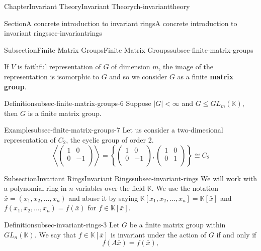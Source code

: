 \documentclass[oneside,10pt,]{book}
\newcommand{\terminology}[1]{\textbf{#1}}
\newcommand{\amp}{&}
\begin{document}
\begin{chapterptx}{Chapter}{Invariant Theory}{}{Invariant Theory}{}{}{ch-invarianttheory}
\begin{sectionptx}{Section}{A concrete introduction to invariant rings}{}{A concrete introduction to invariant rings}{}{}{sec-invariantrings}
\begin{subsectionptx}{Subsection}{Finite Matrix Groups}{}{Finite Matrix Groups}{}{}{subsec-finite-matrix-groups}
\par
If \(V \) is faithful representation of \(G \) of dimension \(m\), the image of the representation is isomorphic to \(G \) and so we consider \(G \) as a finite \terminology{matrix group}.%
\begin{definition}{Definition}{}{subsec-finite-matrix-groups-6}%
Suppose \(|G| < \infty\) and \(G \leq GL_m(\mathbb{K})\),  then \(G\) is a finite matrix group.%
\end{definition}
\begin{example}{Example}{}{subsec-finite-matrix-groups-7}%
Let us consider a two-dimesional representation of \(C_2\), the cyclic group of order 2.%
\begin{equation*}
\left\langle \begin{pmatrix}
1 \amp 0 \\
0 \amp -1 \\
\end{pmatrix} \right\rangle = \left\{ \begin{pmatrix}
1 \amp 0 \\
0 \amp -1 \\
\end{pmatrix},\begin{pmatrix}
1 \amp 0 \\
0 \amp 1 \\
\end{pmatrix} \right \} \cong C_2
\end{equation*}
%
\end{example}
\end{subsectionptx}
%
%
\typeout{************************************************}
\typeout{************************************************}
%
\begin{subsectionptx}{Subsection}{Invariant Rings}{}{Invariant Rings}{}{}{subsec-invariant-rings}
We will work with a polynomial ring in \(n\) variables over the field \(\mathbb{K}\). We use the notation \(\bar x = (x_1, x_2,..., x_n)\) and abuse it by saying \(\mathbb{K}[x_1,x_2,...,x_n]=\mathbb{K}[\bar x]\) and \(f(x_1,x_2,...,x_n)=f(\bar x)\) for \(f \in \mathbb{K}[\bar x]\).%
\begin{definition}{Definition}{}{subsec-invariant-rings-3}%
Let \(G\) be a finite matrix group within \(GL_n(\mathbb{K})\). We say that \(f\in \mathbb{K}[\bar x]\) is invariant under the action of \(G\) if and only if%
\begin{equation*}
f(A\bar x) = f(\bar x),
\end{equation*}

\end{definition}
\end{subsectionptx}
\end{sectionptx}
\end{chapterptx}
\end{document}
